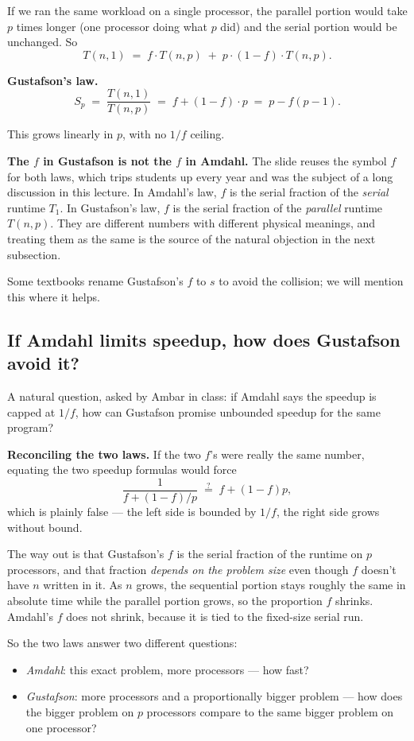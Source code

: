 If we ran the same workload on a single processor, the parallel portion
would take $p$ times longer (one processor doing what $p$ did) and the
serial portion would be unchanged. So
\[
T(n,1) \;=\; f\cdot T(n,p) \;+\; p \cdot (1-f) \cdot T(n,p).
\]

\begin{ppdefn}
\textbf{Gustafson's law.}
\[
S_p \;=\; \frac{T(n,1)}{T(n,p)} \;=\; f + (1-f)\cdot p \;=\; p - f(p-1).
\]
\end{ppdefn}

This grows linearly in $p$, with no $1/f$ ceiling.

\begin{pppitfall}
\textbf{The $f$ in Gustafson is not the $f$ in Amdahl.}
The slide reuses the symbol $f$ for both laws, which trips students up
every year and was the subject of a long discussion in this lecture. In
Amdahl's law, $f$ is the serial fraction of the \emph{serial} runtime
$T_1$. In Gustafson's law, $f$ is the serial fraction of the
\emph{parallel} runtime $T(n,p)$. They are different numbers with
different physical meanings, and treating them as the same is the source of
the natural objection in the next subsection.

Some textbooks rename Gustafson's $f$ to $s$ to avoid the collision; we
will mention this where it helps.
\end{pppitfall}

\subsection{If Amdahl limits speedup, how does Gustafson avoid it?}
\label{sec:reconcile}

A natural question, asked by Ambar in class: if Amdahl says the speedup is
capped at $1/f$, how can Gustafson promise unbounded speedup for the same
program?

\begin{ppnote}
\textbf{Reconciling the two laws.}
If the two $f$'s were really the same number, equating the two speedup
formulas would force
\[
\frac{1}{f + (1-f)/p} \;\stackrel{?}{=}\; f + (1-f)p,
\]
which is plainly false --- the left side is bounded by $1/f$, the right
side grows without bound.

The way out is that Gustafson's $f$ is the serial fraction of the runtime
on $p$ processors, and that fraction \emph{depends on the problem size}
even though $f$ doesn't have $n$ written in it. As $n$ grows, the
sequential portion stays roughly the same in absolute time while the
parallel portion grows, so the proportion $f$ shrinks. Amdahl's $f$ does
not shrink, because it is tied to the fixed-size serial run.

So the two laws answer two different questions:
\begin{itemize}
  \item \textit{Amdahl}: this exact problem, more processors --- how fast?
  \item \textit{Gustafson}: more processors and a proportionally bigger
        problem --- how does the bigger problem on $p$ processors compare
        to the same bigger problem on one processor?
\end{itemize}
\end{ppnote}

